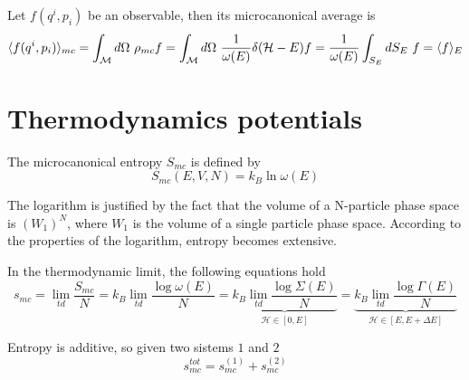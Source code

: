     Let $f(q^i, p_i)$ be an observable, then its microcanonical average is 
    \begin{equation}\label{obs}
        \langle f(q^i, p_i)\rangle_{mc} = \int_{\mathcal M} d\Omega ~ \rho_{mc} f = \int_{\mathcal M} d\Omega ~ \frac{1}{\omega(E)} \delta (\mathcal H - E) f = \frac{1}{\omega(E)} \int_{S_E} dS_E ~ f = \langle f\rangle_{E} 
    \end{equation}

\section{Thermodynamics potentials}

    The microcanonical entropy $S_{mc}$ is defined by 
    \begin{equation*}
        S_{mc} (E, V, N) = k_B \ln \omega(E)
    \end{equation*}

    The logarithm is justified by the fact that the volume of a N-particle phase space is $(W_1)^N$, where $W_1$ is the volume of a single particle phase space. According to the properties of the logarithm, entropy becomes extensive.

    In the thermodynamic limit, the following equations hold 
    \begin{equation*}
        s_{mc} = \lim_{td} \frac{S_{mc}}{N} = k_B \lim_{td} \frac{\log \omega(E)}{N} = \underbrace{k_B \lim_{td} \frac{\log \Sigma(E)}{N}}_{\mathcal H \in [0, E]} = \underbrace{k_B \lim_{td} \frac{\log \Gamma(E)}{N}}_{\mathcal H \in [E, E + \Delta E]}
    \end{equation*}

    Entropy is additive, so given two sistems $1$ and $2$
    \begin{equation*}
        s_{mc}^{tot} = s_{mc}^{(1)} + s_{mc}^{(2)}
    \end{equation*}

